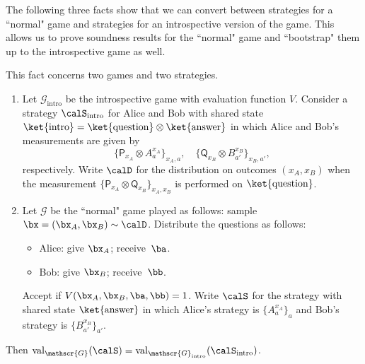 \documentclass[11pt]{article}
\newcommand{\game}{\mathscr{G}}
\newcommand{\valstrat}[2]{\mathrm{val}_{#1}(#2)}
\begin{document}
The following three facts show that we can convert between strategies for a ``normal" game and strategies for an introspective version of the game.
This allows us to prove soundness results for the ``normal" game and ``bootstrap" them up to the introspective game as well.

\begin{fact}\label{fact:introspective-outrospective}
This fact concerns two games and two strategies.
\begin{enumerate}
\item Let $\game_{\mathrm{intro}}$ be the introspective game with evaluation function $V$.
Consider a strategy $\calS_{\mathrm{intro}}$ for Alice and Bob with shared state $\ket{\mathrm{intro}} = \ket{\mathrm{question}}\otimes \ket{\mathrm{answer}}$
in which Alice and Bob's measurements are given by
\begin{equation*}
\{\mathsf{P}_{x_A} \otimes A^{x_A}_a\}_{x_A, a}, \quad \{\mathsf{Q}_{x_B} \otimes B^{x_B}_{a'}\}_{x_B, a'},
\end{equation*} 
respectively.
Write $\calD$ for the distribution on outcomes $(x_A, x_B)$
when the measurement $\{\mathsf{P}_{x_A} \otimes \mathsf{Q}_{x_B}\}_{x_A, x_B}$ is performed on $\ket{\mathrm{question}}$.
\item Let $\game$ be the ``normal" game played as follows: sample $\bx = (\bx_A, \bx_B) \sim \calD$. Distribute the questions as follows:
	\begin{itemize}
	\item[$\circ$] Alice: give $\bx_A$; receive~$\ba$.
	\item[$\circ$] Bob: give $\bx_B$; receive~$\bb$.
	\end{itemize}
	Accept if $V(\bx_A, \bx_B, \ba, \bb) = 1$.
	Write $\calS$ for the strategy with shared state $\ket{\mathrm{answer}}$ in which Alice's strategy is $\{A^{x_A}_a\}_a$
	and Bob's strategy is $\{B^{x_B}_{a'}\}_{a'}$.
\end{enumerate}
Then $\valstrat{\game}{\calS} = \valstrat{\game_{\mathrm{intro}}}{\calS_{\mathrm{intro}}}$.
\end{fact}
\end{document}
